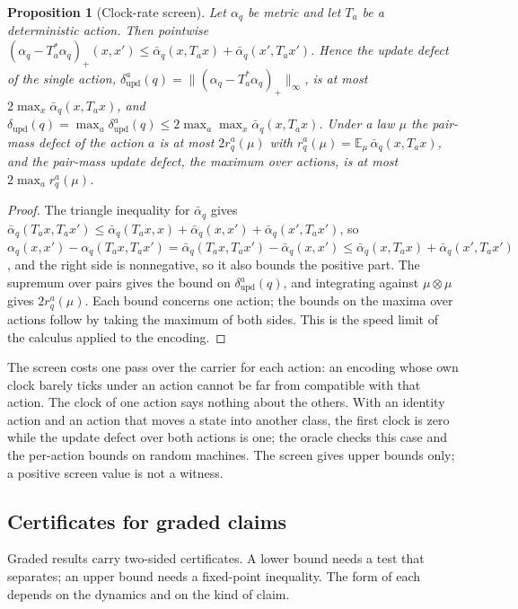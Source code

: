 \documentclass[11pt]{article}
\newcommand{\ab}{\bar\alpha}
\newcommand{\dupd}{\delta_{\mathrm{upd}}}
\theoremstyle{definition}
\theoremstyle{plain}
\newtheorem{proposition}[definition]{Proposition}
\begin{document}
\begin{proposition}[Clock-rate screen]\label{prop:speed}
Let $\alpha_q$ be metric and let $T_a$ be a deterministic action. Then pointwise
$(\alpha_q-T_a^*\alpha_q)_+(x,x')\le\ab_q(x,T_ax)+\ab_q(x',T_ax')$. Hence the update defect of the
single action, $\dupd^a(q)=\|(\alpha_q-T_a^*\alpha_q)_+\|_\infty$, is at most
$2\max_x\ab_q(x,T_ax)$, and $\dupd(q)=\max_a\dupd^a(q)\le2\max_a\max_x\ab_q(x,T_ax)$. Under a law
$\mu$ the pair-mass defect of the action $a$ is at most $2r^a_q(\mu)$ with
$r^a_q(\mu)=\mathbb E_\mu\,\ab_q(x,T_ax)$, and the pair-mass update defect, the maximum over
actions, is at most $2\max_ar^a_q(\mu)$.
\end{proposition}

\begin{proof}
The triangle inequality for $\ab_q$ gives
$\ab_q(T_ax,T_ax')\le\ab_q(T_ax,x)+\ab_q(x,x')+\ab_q(x',T_ax')$, so
$\alpha_q(x,x')-\alpha_q(T_ax,T_ax')=\ab_q(T_ax,T_ax')-\ab_q(x,x')\le\ab_q(x,T_ax)+\ab_q(x',T_ax')$, and
the right side is nonnegative, so it also bounds the positive part. The supremum over pairs gives
the bound on $\dupd^a(q)$, and integrating against $\mu\otimes\mu$ gives $2r^a_q(\mu)$. Each bound
concerns one action; the bounds on the maxima over actions follow by taking the maximum of both
sides. This is the speed limit of the calculus \cite{dcnotes,dclosure} applied to the encoding.
\end{proof}

The screen costs one pass over the carrier for each action: an encoding whose own clock barely
ticks under an action cannot be far from compatible with that action. The clock of one action says
nothing about the others. With an identity action and an action that moves a state into another
class, the first clock is zero while the update defect over both actions is one; the oracle checks
this case and the per-action bounds on random machines. The screen gives upper bounds only; a
positive screen value is not a witness.

\subsection{Certificates for graded claims}\label{sec:certificates}

Graded results carry two-sided certificates. A lower bound needs a test that separates; an upper
bound needs a fixed-point inequality. The form of each depends on the dynamics and on the kind of
claim.
\end{document}
